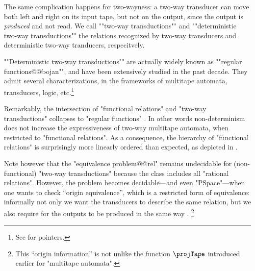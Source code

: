 The same complication happens for two-wayness: a two-way transducer can
move both left and right on its input tape, but not on the output,
since the output is \emph{produced} and not read.
We call \AP""two-way transductions"" and ""deterministic two-way transductions""
the relations recognized by two-way transducers and deterministic two-way tranducers, respecitvely.

""Deterministic two-way transductions"" are actually widely 
known as \AP""regular functions@@bojan"", and have been extensively studied in the past
decade. They admit several characterizations, in the frameworks of multitape automata, transducers, logic, etc.\footnote{See \cite[4th~Paragraph]{Bojanczyk2022Transducers} for pointers.}

Remarkably, the intersection of "functional relations" and "two-way transductions"
collapses to "regular functions" \cite[Theorem 22, p.~243]{EngelfrietHoogeboom2001transduction}.
In other words non-determinism does not increase the expressiveness of two-way multitape automata, when restricted to "functional relations".
As a consequence, the hierarchy of "functional relations" is surprisingly more
linearly ordered than expected, as depicted in .

Note however that the "equivalence problem@@rel" remains undecidable for (non-functional)
"two-way transductions" because the class includes all "rational relations".
However, the problem becomes decidable---and even "PSpace"---when one wants to
check ``origin equivalence'', which is a restricted form of equivalence:
informally not only we want the transducers to describe the same relation, but
we also require for the outputs to be produced in the same way \cite[Theorem~1]{BoseMuschollPuppisPenelle2018OriginEquivalence}.%
\footnote{This ``origin information'' is not unlike the function
$\projTape$ introduced earlier for "multitape automata".}

